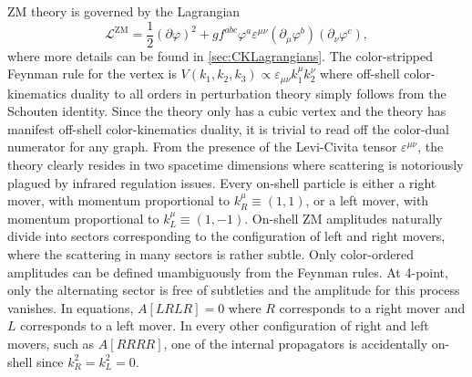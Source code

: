 \documentclass[11pt,letter]{article}
\begin{document}
ZM theory is governed by the Lagrangian
\begin{equation}
\label{eq:ZMLagrangian}
\mathcal{L}^{\text{ZM}} = \frac{1}{2}(\partial \varphi)^2 + g f^{abc} \varphi^a \varepsilon^{\mu\nu}(\partial_\mu \varphi^b)( \partial_\nu \varphi^c),
\end{equation}
where more details can be found in \cref{sec:CKLagrangians}.
The color-stripped Feynman rule for the vertex is $V(k_1, k_2, k_3) \propto \varepsilon_{\mu\nu}k_1^\mu k_2^\nu$ where off-shell color-kinematics duality to all orders in perturbation theory simply follows from the Schouten identity.
Since the theory only has a cubic vertex and the theory has manifest off-shell color-kinematics duality, it is trivial to read off the color-dual numerator for any graph.
From the presence of the Levi-Civita tensor $\varepsilon^{\mu\nu}$, the theory clearly resides in two spacetime dimensions where scattering is notoriously plagued by infrared regulation issues.
Every on-shell particle is either a right mover, with momentum proportional to $k_R^\mu \equiv (1,1)$, or a left mover, with momentum proportional to $k_L^\mu \equiv (1,-1)$.
On-shell ZM amplitudes naturally divide into sectors corresponding to the configuration of left and right movers, where the scattering in many sectors is rather subtle.
Only color-ordered amplitudes can be defined unambiguously from the Feynman rules.
At 4-point, only the alternating sector is free of subtleties and the amplitude for this process vanishes.
In equations, $A[LRLR]=0$ where $R$ corresponds to a right mover and $L$ corresponds to a left mover.
In every other configuration of right and left movers, such as $A[RRRR]$, one of the internal propagators is accidentally on-shell since $k_R^2=k_L^2=0$.
\end{document}
